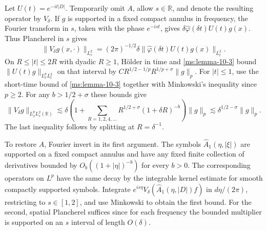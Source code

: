 Let $U(t)=e^{-it|D|}$. Temporarily omit $A$, allow $s\in\mathbb R$, and denote the resulting operator by $V_\delta$. If $g$ is supported in a fixed compact annulus in frequency, the Fourier transform in $s$, taken with the phase $e^{-ist}$, gives $\delta\widehat\varphi(\delta t)U(t)g(x)$. Thus Plancherel in $s$ gives
\[
\|V_\delta g(x,\cdot)\|_{L_s^2}
=(2\pi)^{-1/2}\delta\|\widehat\varphi(\delta t)U(t)g(x)\|_{L_t^2}.
\]
On $R\le|t|\le2R$ with dyadic $R\ge1$, H\"older in time and \ref{ms:lemma-10-3} bound $\|U(t)g\|_{L_x^p L_t^2}$ on that interval by
$C R^{1/2-1/p}R^{1/p+\sigma}\|g\|_p$. For $|t|\le1$, use the short-time bound of \ref{ms:lemma-10-3} together with Minkowski's inequality since $p\ge2$. For any $b>1/2+\sigma$ these bounds give
\[
 \|V_\delta g\|_{L_x^p L_s^2(\mathbb R)}
 \lesssim \delta\left(1+\sum_{R=1,2,4,\ldots}
 R^{1/2+\sigma}(1+\delta R)^{-b}\right)\|g\|_p
 \lesssim \delta^{1/2-\sigma}\|g\|_p .
\]
The last inequality follows by splitting at $R=\delta^{-1}$.

To restore $A$, Fourier invert in its first argument. The symbols $\widehat A_1(\eta,|\xi|)$ are supported on a fixed compact annulus and have any fixed finite collection of derivatives bounded by $O_b((1+|\eta|)^{-b})$ for every $b>0$. The corresponding operators on $L^p$ have the same decay by the integrable kernel estimate for smooth compactly supported symbols. Integrate $e^{is\eta}V_\delta(\widehat A_1(\eta,|D|)f)$ in $d\eta/(2\pi)$, restricting to $s\in[1,2]$, and use Minkowski to obtain the first bound. For the second, spatial Plancherel suffices since for each frequency the bounded multiplier is supported on an $s$ interval of length $O(\delta)$.
